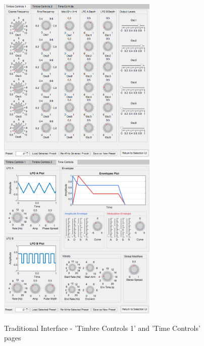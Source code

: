 \documentclass[11pt, oneside]{report}   	%
\begin{document}
\begin{figure}[h] 
	\vspace{-5pt}
	\centering
	\hspace*{-0.2cm}
\includegraphics[width = 3in]{TraditionalUI1.png}
\hspace*{0.2cm}
	\includegraphics[width = 3in]{TraditionalUI3.png}
	\caption{Traditional Interface - 'Timbre Controls 1' and 'Time Controls' pages}
	\label{fig:TraditionalInterface}
	\vspace{-20pt}
\end{figure}
\end{document}
